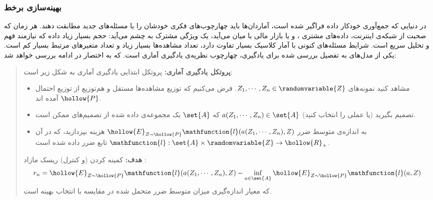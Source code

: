 
\subsubsection{
بهینه‌سازی برخط
}



در دنیایی که جمع‌آوری خودکار داده فراگیر شده است، آماردان‌ها باید چهارچوب‌های فکری خودشان را با مسئله‌های جدید مطابقت دهند. هر زمان که صحبت از شبکه‌ی اینترنت، داده‌های مشتری
، و یا بازار مالی
 با میان می‌آید، یک ویژگی مشترک به چشم می‌آید: حجم بسیار زیاد داده که نیازمند فهم و تحلیل سریع است. شرایط مسئله‌های کنونی با آمار کلاسیک بسیار تفاوت دارد، تعداد مشاهده‌ها بسیار زیاد و تعداد متغیرهای مرتبط بسیار کم است. یکی از مدل‌های به تفصیل بررسی شده برای یادگیری، چهارچوب نظریه‌ی یادگیری آماری
  است. که به اختصار در ادامه بررسی خواهد شد:

\begin{quote}
{\bf
پروتکل
 یادگیری آماری:
} 
پروتکل ابتدایی یادگیری آماری به شکل زیر است:
\begin{itemize}
\item
مشاهد کنید نمونه‌های 
$Z_1, \cdots, Z_n \in \randomvariable{Z}$. 
فرض می‌کنیم که توزیع مشاهده‌ها مستقل و هم‌توزیع
 از توزیع احتمال 
$\hollow{P}$
آمده اند.

\item
تصمیم بگیرید (یا عملی را انتخاب کنید) 
$a( Z_1, \cdots, Z_n ) \in \set{A}$ 
که 
$\set{A}$ 
یک مجموعه‌ی داده شده از تصمیم‌های ممکن است.

\item
به اندازه‌ی متوسط ضرر
$\hollow{E}_{Z \sim \hollow{P}} \mathfunction{l}( a(Z_1,\cdots,Z_n), Z )$ 
هزینه بپردازید، که در آن 
$\mathfunction{l} : \set{A} \times \randomvariable{Z} \rightarrow \hollow{R}_+$ 
تابع ضرر داده شده است.
\end{itemize}

{\bf
هدف:
} 
کمینه کردن (و کنترل) ریسک مازاد
:
\[
r_n = \hollow{E}_{Z \sim \hollow{P}} \mathfunction{l}( a(Z_1, \cdots, Z_n), Z ) - \inf_{a \in \set{A}} \hollow{E}_{Z \sim \hollow{P}} \mathfunction{l} ( a, Z )
\]
که معیار اندازه‌گیری میزان متوسط ضرر متحمل شده در مقایسه با انتخاب بهینه است.

\end{quote}



